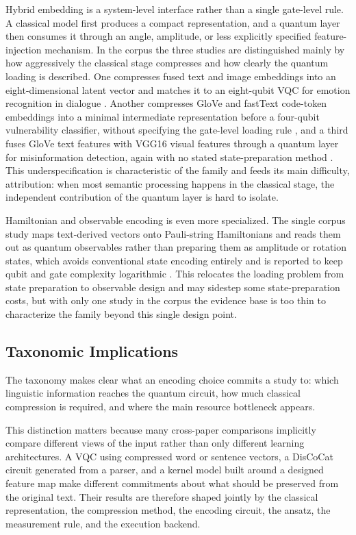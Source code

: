 \documentclass{ieeeaccess}
\begin{document}
Hybrid embedding is a system-level interface rather than a single gate-level rule. A classical model first produces a compact representation, and a quantum layer then consumes it through an angle, amplitude, or less explicitly specified feature-injection mechanism. In the corpus the three studies are distinguished mainly by how aggressively the classical stage compresses and how clearly the quantum loading is described. One compresses fused text and image embeddings into an eight-dimensional latent vector and matches it to an eight-qubit VQC for emotion recognition in dialogue \cite{castrignano_toward_2025}. Another compresses GloVe and fastText code-token embeddings into a minimal intermediate representation before a four-qubit vulnerability classifier, without specifying the gate-level loading rule \cite{akter_automated_2023}, and a third fuses GloVe text features with VGG16 visual features through a quantum layer for misinformation detection, again with no stated state-preparation method \cite{bikku_quantum-enhanced_2025}. This underspecification is characteristic of the family and feeds its main difficulty, attribution: when most semantic processing happens in the classical stage, the independent contribution of the quantum layer is hard to isolate.

Hamiltonian and observable encoding is even more specialized. The single corpus study maps text-derived vectors onto Pauli-string Hamiltonians and reads them out as quantum observables rather than preparing them as amplitude or rotation states, which avoids conventional state encoding entirely and is reported to keep qubit and gate complexity logarithmic \cite{tiblias_efficient_2026}. This relocates the loading problem from state preparation to observable design and may sidestep some state-preparation costs, but with only one study in the corpus the evidence base is too thin to characterize the family beyond this single design point.

\subsection{Taxonomic Implications}

The taxonomy makes clear what an encoding choice commits a study to: which linguistic information reaches the quantum circuit, how much classical compression is required, and where the main resource bottleneck appears.

This distinction matters because many cross-paper comparisons implicitly compare different views of the input rather than only different learning architectures. A VQC using compressed word or sentence vectors, a DisCoCat circuit generated from a parser, and a kernel model built around a designed feature map make different commitments about what should be preserved from the original text. Their results are therefore shaped jointly by the classical representation, the compression method, the encoding circuit, the ansatz, the measurement rule, and the execution backend.
\end{document}
